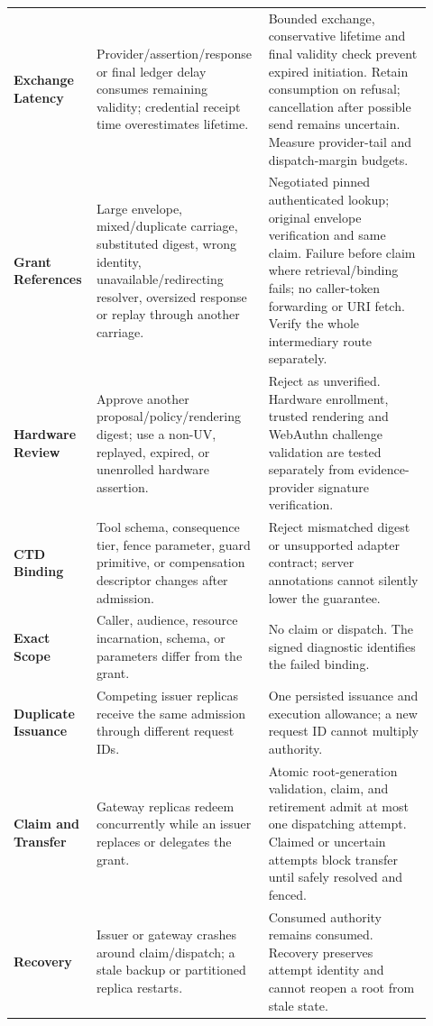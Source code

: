 \begin{longtable}{L{0.18\linewidth}L{0.36\linewidth}L{0.38\linewidth}}
\textbf{Exchange Latency} & Provider/assertion/response or final ledger delay consumes remaining validity; credential receipt time overestimates lifetime. & Bounded exchange, conservative lifetime and final validity check prevent expired initiation. Retain consumption on refusal; cancellation after possible send remains uncertain. Measure provider-tail and dispatch-margin budgets.\\
\textbf{Grant References} & Large envelope, mixed/duplicate carriage, substituted digest, wrong identity, unavailable/redirecting resolver, oversized response or replay through another carriage. & Negotiated pinned authenticated lookup; original envelope verification and same claim. Failure before claim where retrieval/binding fails; no caller-token forwarding or URI fetch. Verify the whole intermediary route separately.\\
\textbf{Hardware Review} & Approve another proposal/policy/rendering digest; use a non-UV, replayed, expired, or unenrolled hardware assertion. & Reject as unverified. Hardware enrollment, trusted rendering and WebAuthn challenge validation are tested separately from evidence-provider signature verification.\\
\textbf{CTD Binding} & Tool schema, consequence tier, fence parameter, guard primitive, or compensation descriptor changes after admission. & Reject mismatched digest or unsupported adapter contract; server annotations cannot silently lower the guarantee.\\
\textbf{Exact Scope} & Caller, audience, resource incarnation, schema, or parameters differ from the grant. & No claim or dispatch. The signed diagnostic identifies the failed binding.\\
\textbf{Duplicate Issuance} & Competing issuer replicas receive the same admission through different request IDs. & One persisted issuance and execution allowance; a new request ID cannot multiply authority.\\
\textbf{Claim and Transfer} & Gateway replicas redeem concurrently while an issuer replaces or delegates the grant. & Atomic root-generation validation, claim, and retirement admit at most one dispatching attempt. Claimed or uncertain attempts block transfer until safely resolved and fenced.\\
\textbf{Recovery} & Issuer or gateway crashes around claim/dispatch; a stale backup or partitioned replica restarts. & Consumed authority remains consumed. Recovery preserves attempt identity and cannot reopen a root from stale state.\\

\end{longtable}
